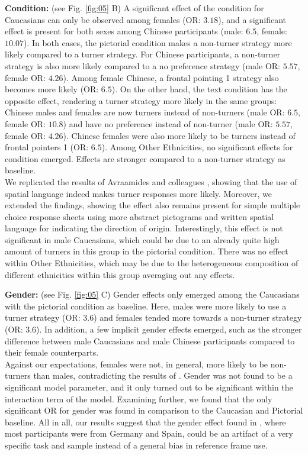 \documentclass{frontiersSCNS} %
\begin{document}
\textbf{Condition:} (see Fig. \ref{fig:05} B)
A significant effect of the condition for Caucasians can only be observed among females (OR: $3.18$), and a significant effect is present for both sexes among Chinese participants (male: $6.5$, female: $10.07$). In both cases, the pictorial condition makes a non-turner strategy more likely compared to a turner strategy. For Chinese participants, a non-turner strategy is also more likely compared to a no preference strategy (male OR: $5.57$, female OR: $4.26$). Among female Chinese, a frontal pointing 1 strategy also becomes more likely (OR: $6.5$). 
On the other hand, the text condition has the opposite effect, rendering a turner strategy more likely in the same groups: Chinese males and females are now turners instead of non-turners (male OR: $6.5$, female OR: $10.8$) and have no preference instead of non-turner (male OR: $5.57$, female OR: $4.26$). Chinese females were also more likely to be turners instead of frontal pointers 1 (OR: $6.5$). Among Other Ethnicities, no significant effects for condition emerged. Effects are stronger compared to a non-turner strategy as baseline.\\
We replicated the results of Avraamides and colleagues \citep{Avraamides2004}, showing that the use of spatial language indeed makes turner responses more likely. Moreover, we extended the findings, showing the effect also remains present for simple multiple choice response sheets using more abstract pictograms and written spatial language for indicating the direction of origin. Interestingly, this effect is not significant in male Caucasians, which could be due to an already quite high amount of turners in this group in the pictorial condition. There was no effect within Other Ethnicities, which may be due to the heterogeneous composition of different ethnicities within this group averaging out any effects.

\textbf{Gender:} (see Fig. \ref{fig:05} C)
Gender effects only emerged among the Caucasians with the pictorial condition as baseline. Here, males were more likely to use a turner strategy (OR: $3.6$) and females tended more towards a non-turner strategy (OR: $3.6$).
In addition, a few implicit gender effects emerged, such as the stronger difference between male Caucasians and male Chinese participants compared to their female counterparts.\\
Against our expectations, females were not, in general, more likely to be non-turners than males, contradicting the results of \citep{Goeke2013}. Gender was not found to be a significant model parameter, and it only turned out to be significant within the interaction term of the model. Examining further, we found that the only significant OR for gender was found in comparison to the Caucasian and Pictorial baseline. All in all, our results suggest that the gender effect found in \cite{Goeke2013}, where most participants were from Germany and Spain, could be an artifact of a very specific task and sample instead of a general bias in reference frame use.
\end{document}
